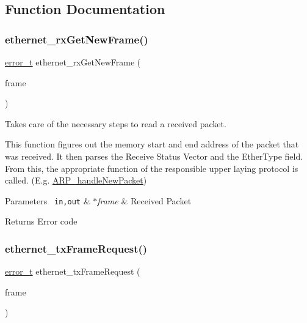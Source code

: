 \subsection{Function Documentation}
\mbox{\label{group__ethernet_ga70be1735d8cd38033d7162e7d94d1eeb}} 
\subsubsection{\texorpdfstring{ethernet\_rxGetNewFrame()}{ethernet\_rxGetNewFrame()}}
{\footnotesize\ttfamily \mbox{\hyperlink{group__error_gad3ae44be85fe6952dcaed425499e8f6b}{error\+\_\+t}} ethernet\+\_\+rx\+Get\+New\+Frame (\begin{DoxyParamCaption}\item[{\mbox{\hyperlink{group__ethernet_ga7519a7ae14b490659069435698d28a25}{ethernet\+Frame\+\_\+t}} $\ast$}]{frame }\end{DoxyParamCaption})}



Takes care of the necessary steps to read a received packet. 

This function figures out the memory start and end address of the packet that was received. It then parses the Receive Status Vector and the Ether\+Type field. From this, the appropriate function of the responsible upper laying protocol is called. (E.\+g. \mbox{\hyperlink{group__arp_ga1ba858e52bf34bca0e5260f0dc0e4641}{A\+R\+P\+\_\+handle\+New\+Packet}}) 
\begin{DoxyParams}[1]{Parameters}
\mbox{\texttt{ in,out}}  & {\em $\ast$frame} & Received Packet \\
\hline
\end{DoxyParams}
\begin{DoxyReturn}{Returns}
Error code 
\end{DoxyReturn}
\mbox{\label{group__ethernet_ga65c7184e84b9d43ceb53481b6b3dedae}} 
\subsubsection{\texorpdfstring{ethernet\_txFrameRequest()}{ethernet\_txFrameRequest()}}
{\footnotesize\ttfamily \mbox{\hyperlink{group__error_gad3ae44be85fe6952dcaed425499e8f6b}{error\+\_\+t}} ethernet\+\_\+tx\+Frame\+Request (\begin{DoxyParamCaption}\item[{\mbox{\hyperlink{group__ethernet_ga7519a7ae14b490659069435698d28a25}{ethernet\+Frame\+\_\+t}} $\ast$}]{frame }\end{DoxyParamCaption})}



